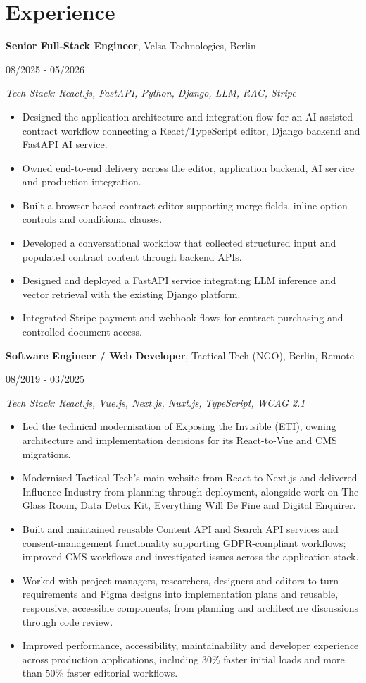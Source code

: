 \documentclass[10pt,a4paper]{article}
\newcommand{\entry}[4]{%
  \Needspace{7\baselineskip}%
  \textbf{#1}, #2\par
  #3\par
  \textit{Tech Stack: #4}\par
}
\begin{document}
\section*{Experience}
\entry{Senior Full-Stack Engineer}{Velsa Technologies, Berlin}{08/2025 - 05/2026}{React.js, FastAPI, Python, Django, LLM, RAG, Stripe}
\begin{itemize}
  \item Designed the application architecture and integration flow for an AI-assisted contract workflow connecting a \mbox{React}/TypeScript editor, Django backend and FastAPI AI service.
  \item Owned end-to-end delivery across the editor, application backend, AI service and production integration.
  \item Built a browser-based contract editor supporting merge fields, inline option controls and conditional clauses.
  \item Developed a conversational workflow that collected structured input and populated contract content through backend APIs.
  \item Designed and deployed a FastAPI service integrating LLM inference and vector retrieval with the existing Django platform.
  \item Integrated Stripe payment and webhook flows for contract purchasing and controlled document access.
\end{itemize}

\entry{Software Engineer / Web Developer}{Tactical Tech (NGO), Berlin, Remote}{08/2019 - 03/2025}{React.js, Vue.js, Next.js, Nuxt.js, TypeScript, WCAG 2.1}
\begin{itemize}
  \item Led the technical modernisation of Exposing the Invisible (ETI), owning architecture and implementation decisions for its React-to-Vue and CMS migrations.
  \item Modernised Tactical Tech's main website from React to Next.js and delivered Influence Industry from planning through deployment, alongside work on The Glass Room, Data Detox Kit, Everything Will Be Fine and Digital Enquirer.
  \item Built and maintained reusable Content API and Search API services and consent-management functionality supporting GDPR-compliant workflows; improved CMS workflows and investigated issues across the application stack.
  \item Worked with project managers, researchers, designers and editors to turn requirements and Figma designs into \mbox{implementation} plans and reusable, responsive, accessible components, from planning and architecture discussions through code review.
  \item Improved performance, accessibility, maintainability and developer experience across production applications, including 30\% faster initial loads and more than 50\% faster editorial workflows.
\end{itemize}
\end{document}
